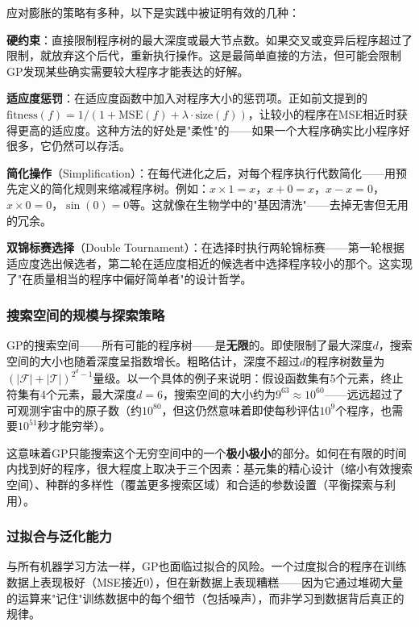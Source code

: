 \documentclass[lang=cn,zihao=-4,a4paper,fontset=windows]{beautybook}
\begin{document}
应对膨胀的策略有多种，以下是实践中被证明有效的几种：

\textbf{硬约束}：直接限制程序树的最大深度或最大节点数。如果交叉或变异后程序超过了限制，就放弃这个后代，重新执行操作。这是最简单直接的方法，但可能会限制GP发现某些确实需要较大程序才能表达的好解。

\textbf{适应度惩罚}：在适应度函数中加入对程序大小的惩罚项。正如前文提到的$\text{fitness}(f) = 1 / (1 + \text{MSE}(f) + \lambda \cdot \text{size}(f))$，让较小的程序在MSE相近时获得更高的适应度。这种方法的好处是"柔性"的——如果一个大程序确实比小程序好很多，它仍然可以存活。

\textbf{简化操作}（Simplification）：在每代进化之后，对每个程序执行代数简化——用预先定义的简化规则来缩减程序树。例如：$x \times 1 = x$，$x + 0 = x$，$x - x = 0$，$x \times 0 = 0$，$\sin(0) = 0$等。这就像在生物学中的"基因清洗"——去掉无害但无用的冗余。

\textbf{双锦标赛选择}（Double Tournament）：在选择时执行两轮锦标赛——第一轮根据适应度选出候选者，第二轮在适应度相近的候选者中选择程序较小的那个。这实现了"在质量相当的程序中偏好简单者"的设计哲学。

\subsubsection{搜索空间的规模与探索策略}

GP的搜索空间——所有可能的程序树——是\textbf{无限}的。即使限制了最大深度$d$，搜索空间的大小也随着深度呈指数增长。粗略估计，深度不超过$d$的程序树数量为$(|\mathcal{F}| + |\mathcal{T}|)^{2^d - 1}$量级。以一个具体的例子来说明：假设函数集有5个元素，终止符集有4个元素，最大深度$d = 6$，搜索空间的大小约为$9^{63} \approx 10^{60}$——远远超过了可观测宇宙中的原子数（约$10^{80}$，但这仍然意味着即使每秒评估$10^9$个程序，也需要$10^{51}$秒才能穷举）。

这意味着GP只能搜索这个无穷空间中的一个\textbf{极小极小}的部分。如何在有限的时间内找到好的程序，很大程度上取决于三个因素：基元集的精心设计（缩小有效搜索空间）、种群的多样性（覆盖更多搜索区域）和合适的参数设置（平衡探索与利用）。

\subsubsection{过拟合与泛化能力}

与所有机器学习方法一样，GP也面临过拟合的风险。一个过度拟合的程序在训练数据上表现极好（MSE接近0），但在新数据上表现糟糕——因为它通过堆砌大量的运算来"记住"训练数据中的每个细节（包括噪声），而非学习到数据背后真正的规律。
\end{document}
